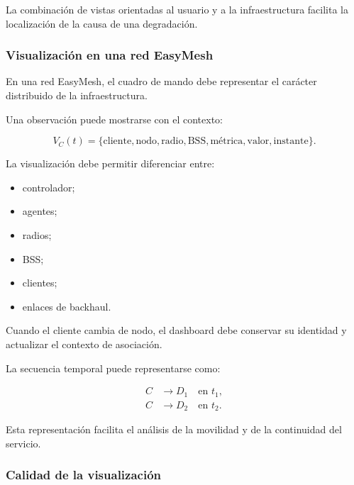 La combinación de vistas orientadas al usuario y a la infraestructura
facilita la localización de la causa de una degradación.


\subsubsection*{Visualización en una red EasyMesh}

En una red EasyMesh, el cuadro de mando debe representar el carácter
distribuido de la infraestructura.

Una observación puede mostrarse con el contexto:

\[
    V_C(t)
    =
    \{
        \text{cliente},
        \text{nodo},
        \text{radio},
        \text{BSS},
        \text{métrica},
        \text{valor},
        \text{instante}
    \}.
\]

La visualización debe permitir diferenciar entre:

\begin{itemize}
    \item controlador;

    \item agentes;

    \item radios;

    \item BSS;

    \item clientes;

    \item enlaces de backhaul.
\end{itemize}

Cuando el cliente cambia de nodo, el dashboard debe conservar su identidad
y actualizar el contexto de asociación.

La secuencia temporal puede representarse como:

\[
\begin{aligned}
    C
    &\longrightarrow
    D_1
    \quad
    \text{en } t_1,\\
    C
    &\longrightarrow
    D_2
    \quad
    \text{en } t_2.
\end{aligned}
\]

Esta representación facilita el análisis de la movilidad y de la
continuidad del servicio.


\subsubsection*{Calidad de la visualización}

